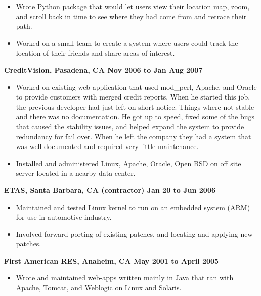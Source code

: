 \documentclass{res}
\begin{document}
\begin{resume}
\begin{itemize}
\item Wrote Python package that would let users view their location
map, zoom, and scroll back in time to see where they had come from
and retrace their path.

\item Worked on a small team to create a system where users could
track the location of their friends and share areas of interest.

\end{itemize}

{\large \bf CreditVision, Pasadena, CA \hfill Nov 2006 to Jan Aug 2007}
\begin{itemize}

\item Worked on existing web application that used mod\_perl, Apache,
and Oracle to provide customers with merged credit reports.  When he
started this job, the previous developer had just left on short notice.
Things where not stable and there was no documentation.  He got up to
speed, fixed some of the bugs that caused the stability issues, and
helped expand the system to provide redundancy for fail over.  When he
left the company they had a system that was well documented and required
very little maintenance.

\item Installed and administered Linux, Apache, Oracle, Open BSD on off
site server located in a nearby data center.

\end{itemize}

{\large \bf ETAS, Santa Barbara, CA (contractor) \hfill Jan 20 to Jun 2006}
\begin{itemize}

\item Maintained and tested Linux kernel to run on an embedded system
(ARM) for use in automotive industry.

\item Involved forward porting of existing patches, and locating and
applying new patches.

\end{itemize}


{\large \bf First American RES, Anaheim, CA \hfill May 2001 to April 2005}
\begin{itemize}

\item Wrote and maintained web-apps written mainly in Java that ran with
Apache, Tomcat, and Weblogic on Linux and Solaris.


\end{itemize}
\end{resume}
\end{document}
